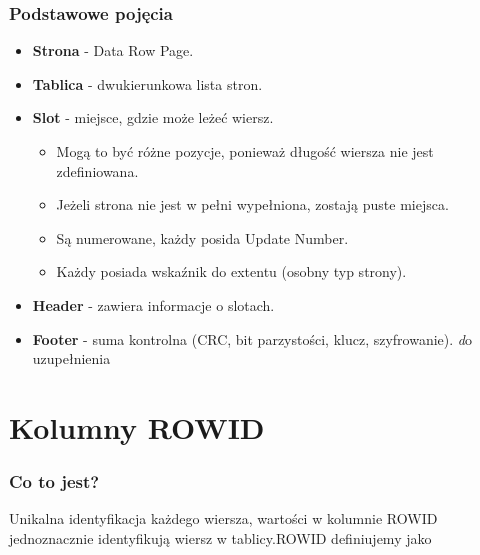 \documentclass[a4paper,twoside]{article}
\begin{document}
  \section*{Podstawowe pojęcia}
      \begin{itemize}
      \item \textbf{Strona} - Data Row Page.
      \item \textbf{Tablica} - dwukierunkowa lista stron.
      \item \textbf{Slot} - miejsce, gdzie może leżeć wiersz.
          \begin{itemize}
          \item Mogą to być różne pozycje, ponieważ długość wiersza nie jest zdefiniowana.
          \item Jeżeli strona nie jest w pełni wypełniona, zostają puste miejsca.
          \item Są numerowane, każdy posida Update Number.
          \item Każdy posiada wskaźnik do extentu (osobny typ strony).
          \end{itemize}
      \item \textbf{Header} - zawiera informacje o slotach.
      \item \textbf{Footer} - suma kontrolna (CRC, bit parzystości, klucz, szyfrowanie). \emph do uzupełnienia
      \end{itemize}

  \part*{Kolumny ROWID}
  \section*{Co to jest?}
      Unikalna identyfikacja każdego wiersza, wartości w kolumnie ROWID jednoznacznie identyfikują wiersz w tablicy.ROWID definiujemy jako
\end{document}
